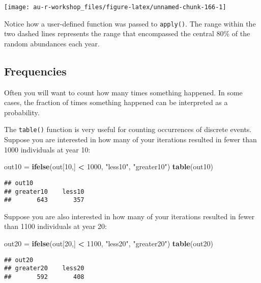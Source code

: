 \documentclass[]{book}
\newenvironment{Shaded}{\begin{snugshade}}{\end{snugshade}}
\newcommand{\KeywordTok}[1]{\textcolor[rgb]{0.13,0.29,0.53}{\textbf{#1}}}
\newcommand{\DecValTok}[1]{\textcolor[rgb]{0.00,0.00,0.81}{#1}}
\newcommand{\StringTok}[1]{\textcolor[rgb]{0.31,0.60,0.02}{#1}}
\newcommand{\OperatorTok}[1]{\textcolor[rgb]{0.81,0.36,0.00}{\textbf{#1}}}
\newcommand{\NormalTok}[1]{#1}
\theoremstyle{definition}
\theoremstyle{definition}
\theoremstyle{definition}
\theoremstyle{remark}
\begin{document}
\begin{center}\texttt{[image: au-r-workshop\_files/figure-latex/unnamed-chunk-166-1]} \end{center}

Notice how a user-defined function was passed to \texttt{apply()}. The
range within the two dashed lines represents the range that encompassed
the central 80\% of the random abundances each year.

\subsection{Frequencies}\label{frequencies}

Often you will want to count how many times something happened. In some
cases, the fraction of times something happened can be interpreted as a
probability.

The \texttt{table()} function is very useful for counting occurrences of
discrete events. Suppose you are interested in how many of your
iterations resulted in fewer than 1000 individuals at year 10:

\begin{Shaded}
\begin{Highlighting}[]
\NormalTok{out10 =}\StringTok{ }\KeywordTok{ifelse}\NormalTok{(out[}\DecValTok{10}\NormalTok{,] }\OperatorTok{<}\StringTok{ }\DecValTok{1000}\NormalTok{, }\StringTok{"less10"}\NormalTok{, }\StringTok{"greater10"}\NormalTok{)}
\KeywordTok{table}\NormalTok{(out10)}
\end{Highlighting}
\end{Shaded}

\begin{verbatim}
## out10
## greater10    less10 
##       643       357
\end{verbatim}

Suppose you are also interested in how many of your iterations resulted
in fewer than 1100 individuals at year 20:

\begin{Shaded}
\begin{Highlighting}[]
\NormalTok{out20 =}\StringTok{ }\KeywordTok{ifelse}\NormalTok{(out[}\DecValTok{20}\NormalTok{,] }\OperatorTok{<}\StringTok{ }\DecValTok{1100}\NormalTok{, }\StringTok{"less20"}\NormalTok{, }\StringTok{"greater20"}\NormalTok{)}
\KeywordTok{table}\NormalTok{(out20)}
\end{Highlighting}
\end{Shaded}

\begin{verbatim}
## out20
## greater20    less20 
##       592       408
\end{verbatim}
\end{document}
